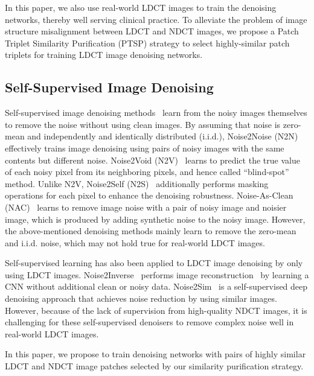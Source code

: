 In this paper, we also use real-world LDCT images to train the denoising networks, thereby well serving clinical practice. To alleviate the problem of image structure misalignment between LDCT and NDCT images, we propose a Patch Triplet Similarity Purification (PTSP) strategy to select highly-similar patch triplets for training LDCT image denoising networks.

\subsection{Self-Supervised Image Denoising}
\label{subsec:unpaired}
Self-supervised image denoising methods~\cite{noise2noise,xu2020noisy} learn from the noisy images themselves to remove the noise without using clean images.
%
By assuming that noise is zero-mean and independently and identically distributed (i.i.d.), Noise2Noise (N2N)~\cite{noise2noise} effectively trains image denoising using pairs of noisy images with the same contents but different noise. Noise2Void (N2V)~\cite{krull2019noise2void} learns to predict the true value of each noisy pixel from its neighboring pixels, and hence called ``blind-spot'' method.
Unlike N2V, Noise2Self (N2S)~\cite{batson2019noise2self} additionally performs masking operations for each pixel to enhance the denoising robustness.
%
Noise-As-Clean (NAC)~\cite{xu2020noisy} learns to remove image noise with a pair of noisy image and noisier image, which is produced by adding synthetic noise to the noisy image.
%
However, the above-mentioned denoising methods mainly learn to remove the zero-mean and i.i.d. noise, which may not hold true for real-world LDCT images.

Self-supervised learning has also been applied to LDCT image denoising by only using LDCT images.
Noise2Inverse~\cite{hendriksen2020noise2inverse} performs image reconstruction~\cite{TMI2} by learning a CNN without additional clean or noisy data.
Noise2Sim~\cite{niu2022noise} is a self-supervised deep denoising approach that achieves noise reduction by using similar images.
%
However, because of the lack of supervision from high-quality NDCT images, it is challenging for these self-supervised denoisers to remove complex noise well in real-world LDCT images.


In this paper,
we propose to train denoising networks with pairs of highly similar LDCT and NDCT image patches selected by our similarity purification strategy.

